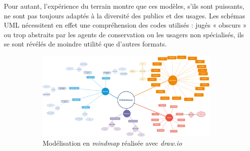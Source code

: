 Pour autant, l'expérience du terrain montre que ces modèles, s'ils sont puissants, ne sont pas toujours adaptés à la diversité des publics et des usages. Les schémas UML nécessitent en effet une compréhension des codes utilisés : jugés « obscurs » ou trop abstraits par les agents de conservation ou les usagers non spécialisés, ils se sont révélés de moindre utilité que d'autres formats. 


\begin{figure}[htbp]
	\centering
	\begin{subfigure}{0.50\textwidth}
		\centering
		\includegraphics[width=\linewidth]{img/MODEL_emediatheque_mindmap}
		\caption{Modélisation en \textit{mindmap} réalisée avec \textit{draw.io}}
		\label{model:mindmap-emediatheque}
	\end{subfigure}
	\begin{subfigure}{0.35\textwidth}
		\centering

\end{subfigure}
\end{figure}
